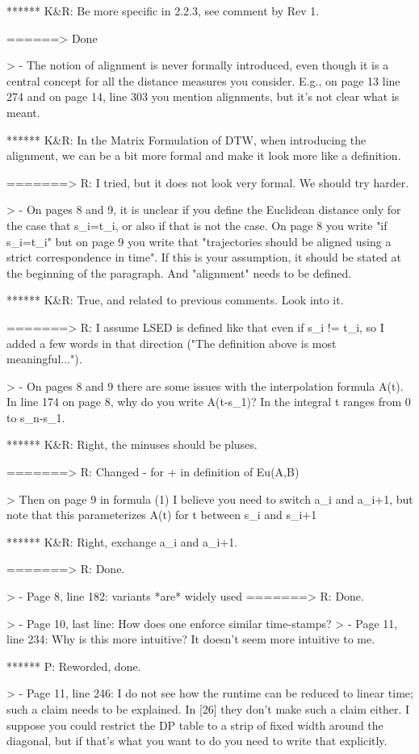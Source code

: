 ****** K&R: Be more specific in 2.2.3, see comment by Rev 1.

======> Done

> - The notion of alignment is never formally introduced, even though it is a central concept for all the distance measures you consider. E.g., on page 13 line 274 and on page 14, line 303 you mention alignments, but it's not clear what is meant.

****** K&R: In the Matrix Formulation of DTW, when introducing the alignment, we can be a bit more formal and make it look more like a definition.

=======> R: I tried, but it does not look very formal. We should try harder.


> - On pages 8 and 9, it is unclear if you define the Euclidean distance only for the case that s_i=t_i, or also if that is not the case. On page 8 you write "if s_i=t_i" but on page 9 you write that "trajectories should be aligned using a strict correspondence in time". If this is your assumption, it should be stated at the beginning of the paragraph. And "alignment" needs to be defined.

****** K&R: True, and related to previous comments. Look into it.

=======> R: I assume LSED is defined like that even if s_i != t_i, so I added a few words in that direction ("The definition above is most meaningful...").

> - On pages 8 and 9 there are some issues with the interpolation formula A(t). In line 174 on page 8, why do you write A(t-s_1)? In the integral t ranges from 0 to s_n-s_1.

****** K&R: Right, the minuses should be pluses.

=======> R: Changed - for + in definition of Eu(A,B)


> Then on page 9 in formula (1) I believe you need to switch a_i and a_{i+1}, but note that this parameterizes A(t) for t between s_i and s_{i+1}

****** K&R: Right, exchange a_i and a_i+1.

=======> R: Done.

> - Page 8, line 182: variants *are* widely used
=======> R: Done.

> - Page 10, last line: How does one enforce similar time-stamps?
> - Page 11, line 234: Why is this more intuitive? It doesn't seem more intuitive to me.

****** P: Reworded, done.

> - Page 11, line 246: I do not see how the runtime can be reduced to linear time; such a claim needs to be explained. In [26] they don't make such a claim either. I suppose you could restrict the DP table to a strip of fixed width around the diagonal, but if that's what you want to do you need to write that explicitly.

